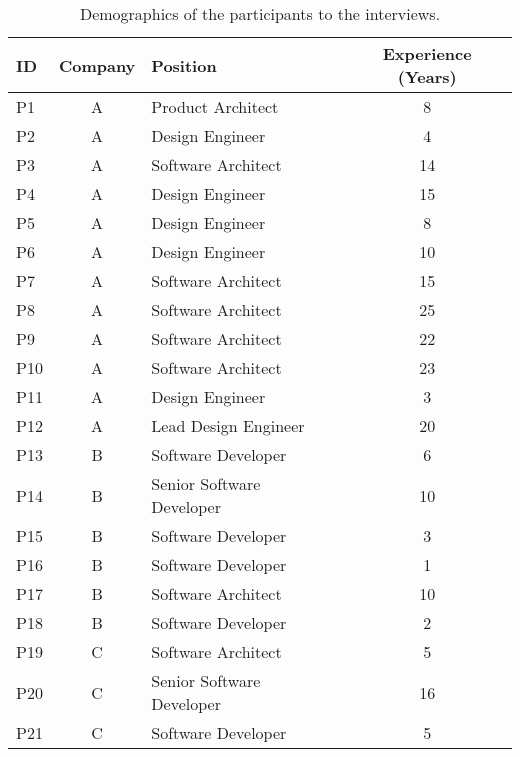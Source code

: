 \begin{table}[h!]
    \centering
   \footnotesize
    \caption{Demographics of the participants to the interviews.}
    \label{c3:tab:participants}
    \begin{tabular}{lclc}
    \toprule
    ID & Company & Position & Experience (Years)\\ \midrule
    P1 & A & Product Architect & 8 \\
    P2 & A & Design Engineer & 4 \\
    P3 & A & Software Architect & 14 \\
    P4 & A & Design Engineer & 15 \\
    P5 & A & Design Engineer & 8 \\
    P6 & A & Design Engineer & 10 \\
    P7 & A & Software Architect & 15 \\
    P8 & A & Software Architect & 25 \\
    P9 & A & Software Architect & 22 \\
    P10 & A & Software Architect & 23 \\
    P11 & A & Design Engineer & 3 \\
    P12 & A & Lead Design Engineer & 20 \\
    P13 & B & Software Developer & 6 \\
    P14 & B & Senior Software Developer & 10 \\
    P15 & B & Software Developer & 3 \\
    P16 & B & Software Developer & 1 \\
    P17 & B & Software Architect & 10 \\
    P18 & B & Software Developer & 2 \\
    P19 & C & Software Architect & 5 \\
    P20 & C & Senior Software Developer & 16 \\
    P21 & C & Software Developer & 5 \\ \bottomrule
    \end{tabular}
\end{table}


